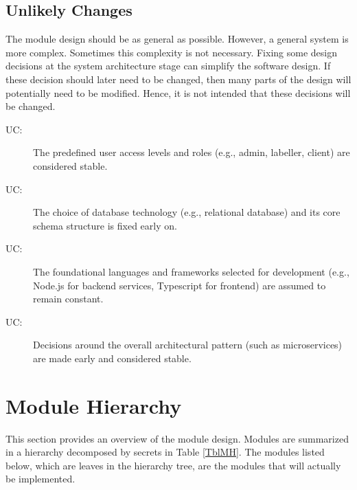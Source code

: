\documentclass[12pt, titlepage]{article}
\newcounter{ucnum}
\newcommand{\uctheucnum}{UC\theucnum}
\begin{document}
\subsection{Unlikely Changes} \label{SecUchange}

The module design should be as general as possible. However, a general system is
more complex. Sometimes this complexity is not necessary. Fixing some design
decisions at the system architecture stage can simplify the software design. If
these decision should later need to be changed, then many parts of the design
will potentially need to be modified. Hence, it is not intended that these
decisions will be changed.

\begin{description}
\item[ \uctheucnum \label{ucUsers}:] The predefined user access levels and roles (e.g., admin, labeller, client) are considered stable.
\item[ \uctheucnum \label{ucDB}:] The choice of database technology (e.g., relational database) and its core schema structure is fixed early on. 
\item[ \uctheucnum \label{ucTech}:] The foundational languages and frameworks selected for development (e.g., Node.js for backend services, Typescript for frontend) are assumed to remain constant.
\item[ \uctheucnum \label{ucArch}:] Decisions around the overall architectural pattern (such as microservices) are made early and considered stable.

\end{description}

\section{Module Hierarchy} \label{SecMH}

This section provides an overview of the module design. Modules are summarized
in a hierarchy decomposed by secrets in Table \ref{TblMH}. The modules listed
below, which are leaves in the hierarchy tree, are the modules that will
actually be implemented.
\end{document}
